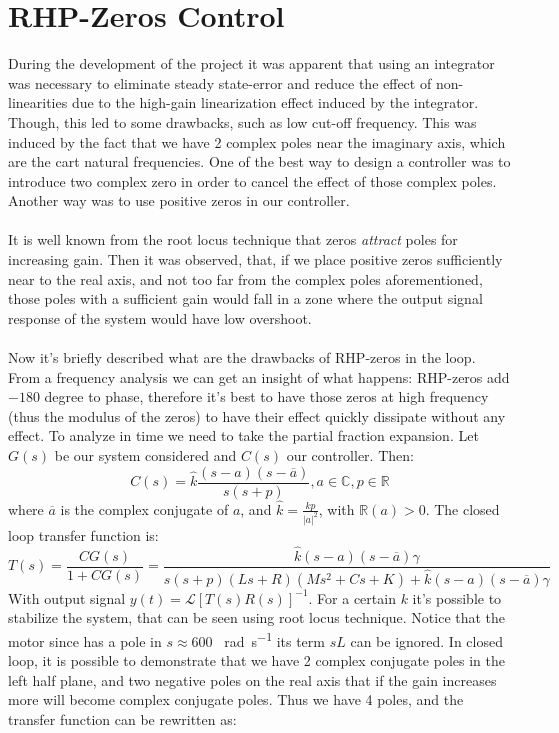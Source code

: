 \section{RHP-Zeros Control}
During the development of the project it was apparent that using an integrator was necessary to eliminate steady state-error and reduce the effect of non-linearities due to the high-gain linearization effect induced by the integrator. Though, this led to some drawbacks, such as low cut-off frequency. This was induced by the fact that we have 2 complex poles near the imaginary axis, which are the cart natural frequencies. One of the best way to design a controller was to introduce two complex zero in order to cancel the effect of those complex poles. Another way was to use positive zeros in our controller.\\ \\
It is well known from the root locus technique that zeros \emph{attract} poles for increasing gain. Then it was observed, that, if we place positive zeros sufficiently near to the real axis, and not too far from the complex poles  aforementioned, those poles with a sufficient gain would fall in a zone where the output signal response of the system would have low overshoot. \\ \\
Now it's briefly described what are the drawbacks of RHP-zeros in the loop. From  a frequency analysis we can get an insight of what happens: RHP-zeros add  $-180$ degree to phase, therefore it's best to have those zeros at high frequency (thus the modulus of the zeros) to have their effect quickly dissipate without any effect. To analyze in time we need to take the partial 	fraction expansion. Let $G(s)$ be our system considered and $C(s)$ our controller. Then:
$$C(s) = \hat{k}\frac{(s-a)(s-\overline{a})}{s(s+p)}, a \in \mathbb{C}, p \in \mathbb{R}$$
where $\overline{a}$ is the complex conjugate of $a$, and $\hat{k}=\frac{kp}{|a|^2}$, with $\mathbb{R}(a) > 0$. 
The closed loop transfer function is:
$$T(s) = \frac{CG(s)}{1+CG(s)} = \frac{\hat{k}(s-a)(s-\overline{a})\gamma}{s(s+p)(Ls+R)(Ms^2+Cs+K)+\hat{k}(s-a)(s-\overline{a})\gamma}$$
With output signal $y(t) = \mathcal{L}[T(s)R(s)]^{-1}$.
For a certain $k$ it's possible to stabilize the system, that can be seen using root locus technique.
Notice that the motor since has a pole in $s \approx 600$ \SI{}{\radian \per \second} its term $sL$ can be ignored. In closed loop, it is possible to demonstrate that we have 2 complex conjugate poles in the left half plane, and two negative poles on the real axis that if the gain increases more will become complex conjugate poles. Thus we have 4 poles, and the transfer function can be rewritten as:
